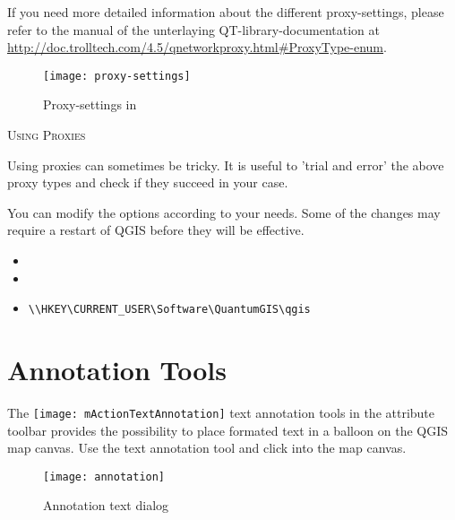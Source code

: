 If you need more detailed information about the different proxy-settings,
please refer to the manual of the unterlaying QT-library-documentation at
\url{http://doc.trolltech.com/4.5/qnetworkproxy.html#ProxyType-enum}.

\begin{figure}[ht]
   \centering
   \texttt{[image: proxy-settings]}
   \caption{Proxy-settings in \qg \nixcaption}
   \label{fig:proxy-settings}
\end{figure}

\begin{Tip} \caption{\textsc{Using Proxies}}
Using proxies can sometimes be tricky. It is useful to 'trial and
error' the above proxy types and check if they succeed in your case.
\end{Tip}

You can modify the options according to your needs. Some of the changes may
require a restart of QGIS before they will be effective.

\begin{itemize}
\item {}
\item {}
\item {}
\begin{verbatim}
\\HKEY\CURRENT_USER\Software\QuantumGIS\qgis
\end{verbatim}
\end{itemize}

\section{Annotation Tools}\label{sec:annotations}

The \texttt{[image: mActionTextAnnotation]} text
annotation tools in the attribute toolbar provides the possibility to
place formated text in a balloon on the QGIS map canvas. Use the text
annotation tool and click into the map canvas.

\begin{figure}[ht]
   \centering
   \texttt{[image: annotation]}
   \caption{Annotation text dialog \nixcaption}
   \label{fig:annotation}
\end{figure}

